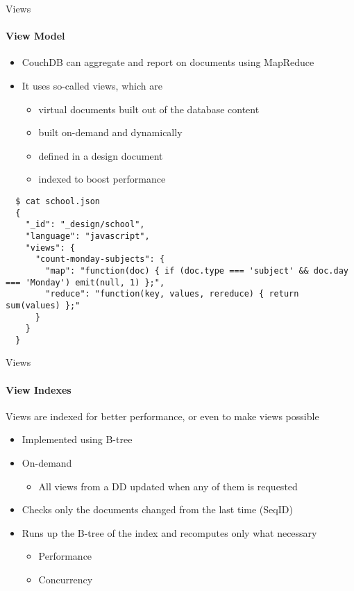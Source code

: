 \documentclass{beamer}
\begin{document}
\begin{frame}[fragile]{Views}
  \framesubtitle{View Model}
  \begin{itemize}
    \item CouchDB can aggregate and report on documents using MapReduce
    \item It uses so-called views, which are 
    \begin{itemize}
      \item virtual documents built out of the database content
      \item built on-demand and dynamically
      \item defined in a design document
      \item indexed to boost performance
    \end{itemize}
  \end{itemize}
  \fontsize{6}{8}\selectfont
  \begin{verbatim}
  $ cat school.json 
  {
    "_id": "_design/school",
    "language": "javascript",
    "views": {
      "count-monday-subjects": {
        "map": "function(doc) { if (doc.type === 'subject' && doc.day === 'Monday') emit(null, 1) };",
        "reduce": "function(key, values, rereduce) { return sum(values) };"
      }
    }
  }
  \end{verbatim}
\end{frame}

\begin{frame}{Views}
  \framesubtitle{View Indexes}
  Views are indexed for better performance, or even to make views possible
  \begin{itemize}
    \item Implemented using B-tree
    \item On-demand
    \begin{itemize}
      \item All views from a DD updated when any of them is requested
    \end{itemize}
    \item Checks only the documents changed from the last time (SeqID)
    \item Runs up the B-tree of the index and recomputes only what necessary
    \begin{itemize}
      \item Performance
      \item Concurrency
    \end{itemize}
  \end{itemize}
\end{frame}
\end{document}
